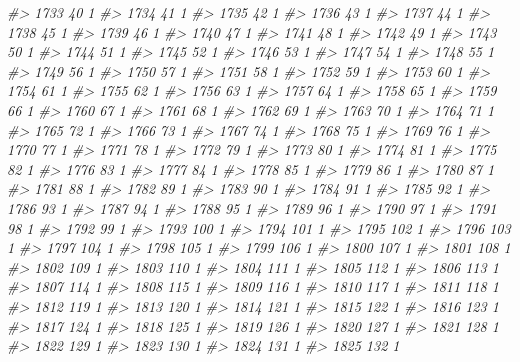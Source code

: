 \documentclass[]{article}
\newenvironment{Shaded}{\begin{snugshade}}{\end{snugshade}}
\newcommand{\CommentTok}[1]{\textcolor[rgb]{0.56,0.35,0.01}{\textit{#1}}}
\begin{document}
\begin{Shaded}
\begin{Highlighting}[]
\CommentTok{#> 1733  40  1}
\CommentTok{#> 1734  41  1}
\CommentTok{#> 1735  42  1}
\CommentTok{#> 1736  43  1}
\CommentTok{#> 1737  44  1}
\CommentTok{#> 1738  45  1}
\CommentTok{#> 1739  46  1}
\CommentTok{#> 1740  47  1}
\CommentTok{#> 1741  48  1}
\CommentTok{#> 1742  49  1}
\CommentTok{#> 1743  50  1}
\CommentTok{#> 1744  51  1}
\CommentTok{#> 1745  52  1}
\CommentTok{#> 1746  53  1}
\CommentTok{#> 1747  54  1}
\CommentTok{#> 1748  55  1}
\CommentTok{#> 1749  56  1}
\CommentTok{#> 1750  57  1}
\CommentTok{#> 1751  58  1}
\CommentTok{#> 1752  59  1}
\CommentTok{#> 1753  60  1}
\CommentTok{#> 1754  61  1}
\CommentTok{#> 1755  62  1}
\CommentTok{#> 1756  63  1}
\CommentTok{#> 1757  64  1}
\CommentTok{#> 1758  65  1}
\CommentTok{#> 1759  66  1}
\CommentTok{#> 1760  67  1}
\CommentTok{#> 1761  68  1}
\CommentTok{#> 1762  69  1}
\CommentTok{#> 1763  70  1}
\CommentTok{#> 1764  71  1}
\CommentTok{#> 1765  72  1}
\CommentTok{#> 1766  73  1}
\CommentTok{#> 1767  74  1}
\CommentTok{#> 1768  75  1}
\CommentTok{#> 1769  76  1}
\CommentTok{#> 1770  77  1}
\CommentTok{#> 1771  78  1}
\CommentTok{#> 1772  79  1}
\CommentTok{#> 1773  80  1}
\CommentTok{#> 1774  81  1}
\CommentTok{#> 1775  82  1}
\CommentTok{#> 1776  83  1}
\CommentTok{#> 1777  84  1}
\CommentTok{#> 1778  85  1}
\CommentTok{#> 1779  86  1}
\CommentTok{#> 1780  87  1}
\CommentTok{#> 1781  88  1}
\CommentTok{#> 1782  89  1}
\CommentTok{#> 1783  90  1}
\CommentTok{#> 1784  91  1}
\CommentTok{#> 1785  92  1}
\CommentTok{#> 1786  93  1}
\CommentTok{#> 1787  94  1}
\CommentTok{#> 1788  95  1}
\CommentTok{#> 1789  96  1}
\CommentTok{#> 1790  97  1}
\CommentTok{#> 1791  98  1}
\CommentTok{#> 1792  99  1}
\CommentTok{#> 1793 100  1}
\CommentTok{#> 1794 101  1}
\CommentTok{#> 1795 102  1}
\CommentTok{#> 1796 103  1}
\CommentTok{#> 1797 104  1}
\CommentTok{#> 1798 105  1}
\CommentTok{#> 1799 106  1}
\CommentTok{#> 1800 107  1}
\CommentTok{#> 1801 108  1}
\CommentTok{#> 1802 109  1}
\CommentTok{#> 1803 110  1}
\CommentTok{#> 1804 111  1}
\CommentTok{#> 1805 112  1}
\CommentTok{#> 1806 113  1}
\CommentTok{#> 1807 114  1}
\CommentTok{#> 1808 115  1}
\CommentTok{#> 1809 116  1}
\CommentTok{#> 1810 117  1}
\CommentTok{#> 1811 118  1}
\CommentTok{#> 1812 119  1}
\CommentTok{#> 1813 120  1}
\CommentTok{#> 1814 121  1}
\CommentTok{#> 1815 122  1}
\CommentTok{#> 1816 123  1}
\CommentTok{#> 1817 124  1}
\CommentTok{#> 1818 125  1}
\CommentTok{#> 1819 126  1}
\CommentTok{#> 1820 127  1}
\CommentTok{#> 1821 128  1}
\CommentTok{#> 1822 129  1}
\CommentTok{#> 1823 130  1}
\CommentTok{#> 1824 131  1}
\CommentTok{#> 1825 132  1}

\end{Highlighting}
\end{Shaded}
\end{document}
